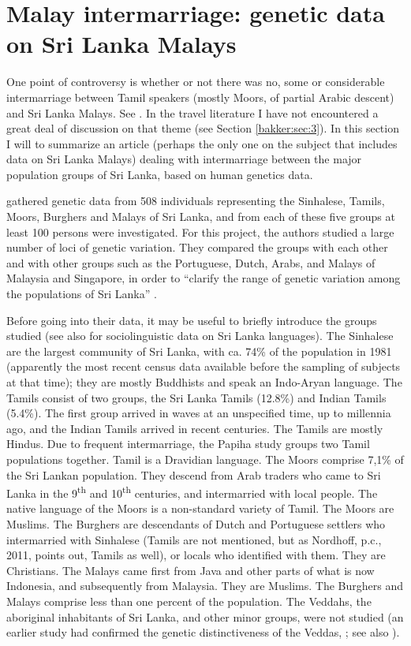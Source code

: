 \section{Malay intermarriage: genetic data on Sri Lanka Malays}\label{bakker:sec:2}
One point of controversy is whether or not there was no, some or considerable intermarriage between Tamil speakers (mostly Moors, of partial Arabic descent) and Sri Lanka Malays. See \citet{Slomansontv}. In the travel literature I have not encountered a great deal of discussion on that theme (see Section \ref{bakker:sec:3}). In this section I will to summarize an article (perhaps the only one on the subject that includes data on Sri Lanka Malays) dealing with intermarriage between the major population groups of Sri Lanka, based on human genetics data.

\citet{PapihaEtAl1996} gathered genetic data from 508 individuals representing the Sinhalese, Tamils, Moors, Burghers and Malays of Sri Lanka, and from each of these five groups at least 100 persons were investigated. For this project, the authors studied a large number of loci of genetic variation. They compared the groups with each other and with other groups such as the Portuguese, Dutch, Arabs, and Malays of Malaysia and Singapore, in order to ``clarify the range of genetic variation among the populations of Sri Lanka'' \citep[707]{PapihaEtAl1996}.

Before going into their data, it may be useful to briefly introduce the groups studied (see also \citet{Coperahewa2009} for sociolinguistic data on Sri Lanka languages). The Sinhalese are the largest community of Sri Lanka, with ca. 74\% of the population in 1981 (apparently the most recent census data available before the sampling of subjects at that time); they are mostly Buddhists and speak an Indo-Aryan language. The Tamils consist of two groups, the Sri Lanka Tamils (12.8\%) and Indian Tamils (5.4\%). The first group arrived in waves at an unspecified time, up to millennia ago, and the Indian Tamils arrived in recent centuries. The Tamils are mostly Hindus. Due to frequent intermarriage, the Papiha study groups two Tamil populations together. Tamil is a Dravidian language. The Moors comprise 7,1\% of the Sri Lankan population. They descend from Arab traders who came to Sri Lanka in the 9\textsuperscript{th} and 10\textsuperscript{th} centuries, and intermarried with local people. The native language of the Moors is a non-standard variety of Tamil. The Moors are Muslims. The Burghers are descendants of Dutch and Portuguese settlers who intermarried with Sinhalese (Tamils are not mentioned, but as Nordhoff, p.c., 2011, points out, Tamils as well), or locals who identified with them. They are Christians. The Malays came first from  Java and other parts of what is now Indonesia, and subsequently from Malaysia. They are Muslims. The Burghers and Malays comprise less than one percent of the population. The Veddahs, the aboriginal inhabitants of Sri Lanka, and other minor groups, were not studied (an earlier study had confirmed the genetic distinctiveness of the Veddas, \citet[708]{PapihaEtAl1996}; see also \citet{Stoudt1961}).


